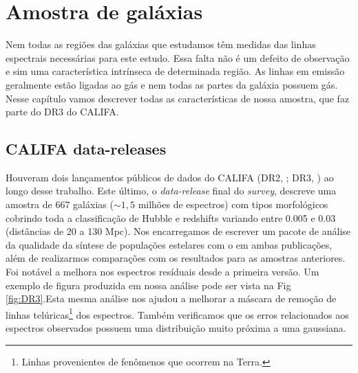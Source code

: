 


\chapter{Amostra de galáxias}
\label{sec:amostra}

Nem todas as regiões das galáxias que estudamos têm medidas das linhas espectrais necessárias para este estudo. Essa falta não é um defeito de observação e sim uma característica intrínseca de determinada região. As linhas em emissão geralmente estão ligadas ao gás e nem todas as partes da galáxia possuem gás. Nesse capítulo vamos descrever todas as características de nossa amostra, que faz parte do DR3 do CALIFA.

\section{CALIFA data-releases}
\label{sec:amostra:DR2eDR3}

Houveram dois lançamentos públicos de dados do CALIFA (DR2, \citealt{GarciaBenito.etal.2015a}; DR3, \citealt{SFSanchez.DR3.2016}) ao longo desse trabalho. Este último, o {\em data-release} final do {\em survey}, descreve uma amostra de 667 galáxias ($\sim 1,5$ milhões de espectros) com tipos morfológicos cobrindo toda a classificação de Hubble e redshifts variando entre 0.005 e 0.03 (distâncias de 20 a 130 Mpc). Nos encarregamos de escrever um pacote de análise da qualidade da síntese de populações estelares com o \starlight em ambas publicações, além de realizarmos comparações com os resultados para as amostras anteriores. Foi notável a melhora nos espectros resíduais desde a primeira versão. Um exemplo de figura produzida em nossa análise pode ser vista na Fig \ref{fig:DR3}.Esta mesma análise nos ajudou a melhorar a máscara de remoção de linhas telúricas\footnote{Linhas provenientes de fenômenos que ocorrem na Terra.} dos espectros. Também verificamos que os erros relacionados aos espectros observados possuem uma distribuição muito próxima a uma gaussiana.

